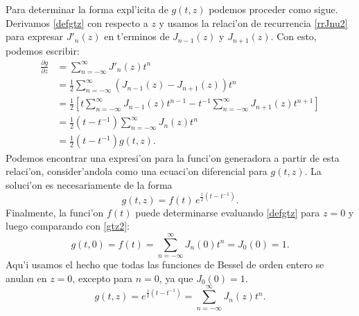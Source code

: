Para determinar la forma expl'icita de $g(t,z)$ podemos proceder como sigue. Derivamos \eqref{defgtz} con respecto a $z$ y usamos la relaci'on de recurrencia \eqref{rrJnu2} para expresar $J'_n(z)$ en t'erminos de  $J_{n-1}(z)$ y $J_{n+1}(z)$. Con esto, podemos escribir:
\begin{align}
\frac{\partial g}{\partial z} &= \sum_{n=-\infty}^\infty J'_n(z) t^n \\
&= \frac{1}{2}\sum_{n=-\infty}^\infty \left(J_{n-1}(z)-J_{n+1}(z)\right) t^n \\
&= \frac{1}{2}\left[t\sum_{n=-\infty}^\infty J_{n-1}(z)t^{n-1}-t^{-1}\sum_{n=-\infty}^\infty J_{n+1}(z)t^{n+1} \right]\\
&= \frac{1}{2}\left(t-t^{-1}\right)\sum_{n = -\infty}^\infty J_n(z) t^n\\
&= \frac{1}{2}\left(t-t^{-1}\right)g(t,z).
\end{align}
Podemos encontrar una expresi'on para la funci'on generadora a partir de esta relaci'on, consider'andola como una ecuaci'on diferencial para $g(t,z)$. La soluci'on es necesariamente de la forma
\begin{equation}\label{gtz2}
g(t,z)=f(t)\,e^{\frac{z}{2}\left(t-t^{-1}\right)}.
\end{equation}
Finalmente, la funci'on $f(t)$ puede determinarse evaluando \eqref{defgtz} para $z=0$ y luego comparando con \eqref{gtz2}:
\begin{equation}\label{gtz3}
g(t,0)=f(t)=\sum_{n = -\infty}^\infty J_n(0) t^n=J_0(0)=1.
\end{equation}
Aqu'i usamos el hecho que todas las funciones de Bessel de orden entero se anulan en $z=0$, excepto para $n=0$, ya que $J_0(0)=1$.
\begin{equation}\label{gtzJ}
\boxed{g(t,z)=e^{\frac{z}{2}\left(t-t^{-1}\right)}=\sum_{n = -\infty}^\infty J_n(z) t^n.}
\end{equation}

